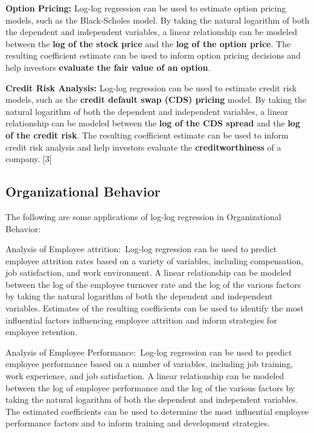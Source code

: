 \documentclass[
  letterpaper,
  DIV=11,
  numbers=noendperiod]{scrreport}
\begin{document}
\textbf{Option Pricing:} Log-log regression can be used to estimate
option pricing models, such as the Black-Scholes model. By taking the
natural logarithm of both the dependent and independent variables, a
linear relationship can be modeled between the \textbf{log of the stock
price} and the \textbf{log of the option price}. The resulting
coefficient estimate can be used to inform option pricing decisions and
help investors \textbf{evaluate the fair value of an option}.

\textbf{Credit Risk Analysis:} Log-log regression can be used to
estimate credit risk models, such as the \textbf{credit default swap
(CDS) pricing} model. By taking the natural logarithm of both the
dependent and independent variables, a linear relationship can be
modeled between the \textbf{log of the CDS spread} and the \textbf{log
of the credit risk}. The resulting coefficient estimate can be used to
inform credit risk analysis and help investors evaluate the
\textbf{creditworthiness} of a company. {[}3{]}

\subsection{Organizational Behavior}\label{organizational-behavior}

The following are some applications of log-log regression in
Organizational Behavior:

Analysis of Employee attrition:~Log-log regression can be used to
predict employee attrition rates based on a variety of variables,
including compensation, job satisfaction, and work environment. A linear
relationship can be modeled between the log of the employee turnover
rate and the log of the various factors by taking the natural logarithm
of both the dependent and independent variables. Estimates of the
resulting coefficients can be used to identify the most influential
factors influencing employee attrition and inform strategies for
employee retention.

Analysis of Employee Performance:~Log-log regression can be used to
predict employee performance based on a number of variables, including
job training, work experience, and job satisfaction. A linear
relationship can be modeled between the log of employee performance and
the log of the various factors by taking the natural logarithm of both
the dependent and independent variables. The estimated coefficients can
be used to determine the most influential employee performance factors
and to inform training and development strategies.
\end{document}
